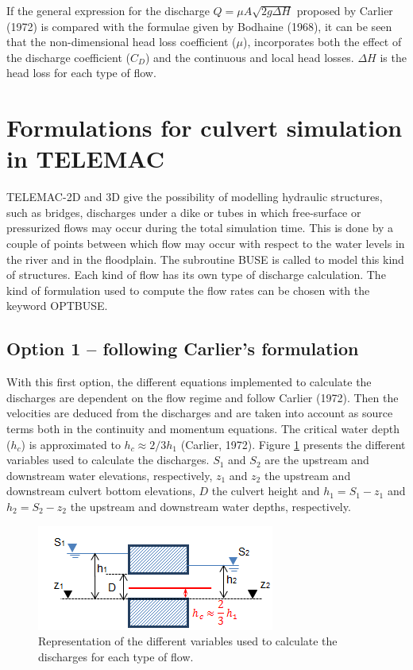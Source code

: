 If the general expression for the discharge $Q=\mu A \sqrt{2g\Delta H}$ proposed by
Carlier (1972) is compared with the formulae given by Bodhaine (1968),
it can be seen that the non-dimensional head loss coefficient ($\mu$),
incorporates both the effect of the discharge coefficient ($C_D$) and the continuous
and local head losses. $\Delta H$ is the head loss for each type of flow.

\section{Formulations for culvert simulation in TELEMAC}

TELEMAC-2D and 3D give the possibility of modelling hydraulic structures, such as bridges,
discharges under a dike or tubes in which free-surface or pressurized flows may
occur during the total simulation time.
This is done by a couple of points between which flow may occur with respect to
the water levels in the river and in the floodplain.
The subroutine BUSE is called to model this kind of structures.
Each kind of flow has its own type of discharge calculation.
The kind of formulation used to compute the flow rates can be chosen with the keyword OPTBUSE.

\subsection{Option 1 -- following Carlier's formulation}

With this first option, the different equations implemented to calculate the
discharges are dependent on the flow regime and follow Carlier (1972).
Then the velocities are deduced from the discharges and are taken into account as source
terms both in the continuity and momentum equations.
The critical water depth ($h_c$) is approximated to $h_c \approx 2/3 h_1$ (Carlier, 1972).
Figure \ref{fig:culvert_fig5} presents the different variables used to calculate the discharges.
$S_1$ and $S_2$ are the upstream and downstream water elevations, respectively, $z_1$ and $z_2$
the upstream and downstream culvert bottom elevations, $D$ the culvert height and $h_1=S_1-z_1$
and $h_2=S_2-z_2$ the upstream and downstream water depths, respectively.

\begin{figure}[H]
\begin{center}
  \includegraphics[scale=1]{culvert_fig5.png}
\end{center}
\caption{Representation of the different variables used to calculate
the discharges for each type of flow.}
\label{fig:culvert_fig5}
\end{figure}

